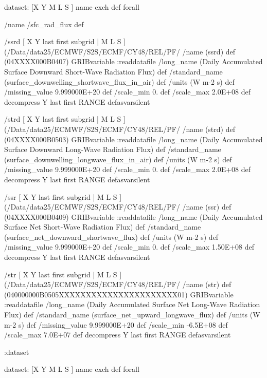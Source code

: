 \begin{ingrid}


dataset:
[X Y M L S ] {name exch def } forall

/name /sfc_rad_flux def

/ssrd { [ X Y last first subgrid | M L S ] (/Data/data25/ECMWF/S2S/ECMF/CY48/REL/PF/%
/name (ssrd) def
(04XXXX000B0407) GRIBvariable
:readdatafile
/long_name (Daily Accumulated Surface Downward Short-Wave Radiation Flux) def
/standard_name (surface_downwelling_shortwave_flux_in_air) def
/units (W m-2 s) def
/missing_value 9.999000E+20 def
/scale_min 0. def
/scale_max 2.0E+08 def
decompress
Y last first RANGE
} defasvarsilent

/strd { [ X Y last first subgrid | M L S ] (/Data/data25/ECMWF/S2S/ECMF/CY48/REL/PF/%
/name (strd) def
(04XXXX000B0503) GRIBvariable
:readdatafile
/long_name (Daily Accumulated Surface Downward Long-Wave Radiation Flux) def
/standard_name (surface_downwelling_longwave_flux_in_air) def
/units (W m-2 s) def
/missing_value 9.999000E+20 def
/scale_min 0. def
/scale_max 2.0E+08 def
decompress
Y last first RANGE
} defasvarsilent

/ssr { [ X Y last first subgrid | M L S ] (/Data/data25/ECMWF/S2S/ECMF/CY48/REL/PF/%
/name (ssr) def
(04XXXX000B0409) GRIBvariable
:readdatafile
/long_name (Daily Accumulated Surface Net Short-Wave Radiation Flux) def
/standard_name (surface_net_downward_shortwave_flux) def
/units (W m-2 s) def
/missing_value 9.999000E+20 def
/scale_min 0. def
/scale_max 1.50E+08 def
decompress
Y last first RANGE
} defasvarsilent

/str { [ X Y last first subgrid | M L S ] (/Data/data25/ECMWF/S2S/ECMF/CY48/REL/PF/%
/name (str) def
(040000000B0505XXXXXXXXXXXXXXXXXXXXXX01) GRIBvariable
:readdatafile
/long_name (Daily Accumulated Surface Net Long-Wave Radiation Flux) def
/standard_name (surface_net_upward_longwave_flux) def
/units (W m-2 s) def
/missing_value 9.999000E+20 def
/scale_min -6.5E+08 def
/scale_max 7.0E+07 def
decompress
Y last first RANGE
} defasvarsilent

:dataset

dataset:
[X Y M L S ] {name exch def } forall


\end{ingrid}
